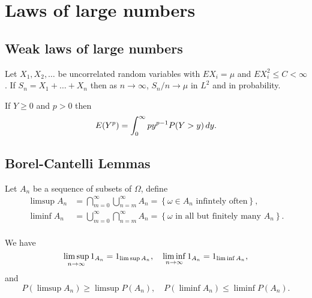 \documentclass[a4paper]{article}
\begin{document}
\maketitle

\setcounter{section}{1}
\section{Laws of large numbers}

\setcounter{subsection}{1}

\subsection{Weak laws of large numbers}
\begin{thm}
Let $X_1, X_2, \dots$ be uncorrelated random variables with $EX_i = \mu$
and $E X_i^2 \leq C < \infty$. If $S_n = X_1 + \dots + X_n$ then 
as $n \to \infty$, $S_n / n \to \mu$ in $L^2$ and in probability.
\end{thm}


\begin{lemma}
  If $Y \geq 0$ and $p > 0$ then 
  \[
  E(Y^p) = \int_0^\infty p y^{p - 1} P(Y > y) \, d y.
  \]
\end{lemma}

\subsection{Borel-Cantelli Lemmas}

\begin{defi}
  Let $A_n$ be a sequence of subsets of $\Omega$, define 
  \[
  \begin{aligned}
    \limsup A_n 
    &= \bigcap_{m = 0}^\infty \bigcup_{n = m}^\infty A_n 
    = \left\{ \omega \in A_n \text{ infintely often} \right\}, \\
    \liminf A_n 
    &= \bigcup_{m = 0}^\infty \bigcap_{n = m}^\infty A_n 
    = \left\{ \text{$\omega$ in all but finitely many $A_n$} \right\}. \\
  \end{aligned}
  \]
\end{defi}

\begin{prop}
  We have 
  \[
  \limsup_{n \to \infty} 1_{A_n} = 1_{\limsup A_n}, \quad 
  \liminf_{n \to \infty} 1_{A_n} = 1_{\liminf A_n},
  \]
  and 
  \[
  P(\limsup A_n) \geq \limsup P(A_n), \quad 
  P(\liminf A_n) \leq \liminf P(A_n).
  \]
\end{prop}
\end{document}
